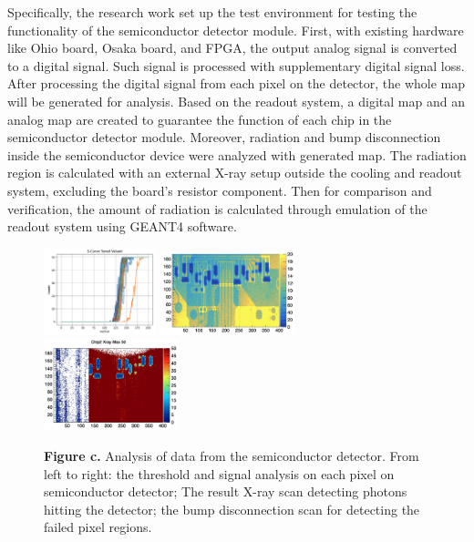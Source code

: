 \documentclass{article}
\begin{document}
Specifically, the research work set up the test environment for testing 
the functionality of the semiconductor detector module.
First, with existing hardware like Ohio board, Osaka board, and FPGA, the 
output analog signal is converted to a digital signal. 
Such signal is processed with supplementary digital signal loss. 
After processing the digital signal from each pixel on the detector, 
the whole map will be generated for analysis. Based on the readout system,
 a digital map and an analog map are created to guarantee the function of 
 each chip in the semiconductor detector module. Moreover, 
 radiation and bump disconnection inside the semiconductor device 
 were analyzed with generated map. The radiation region is calculated 
 with an external X-ray setup outside the cooling and readout system, 
 excluding the board's resistor component. Then for comparison and verification, 
 the amount of radiation is calculated through emulation of the readout system using GEANT4 software. 
\begin{figure}[h]
  \begin{center}
    \includegraphics[width=0.29\textwidth]{thesispic/ch3_normal_scurve.png}
    \includegraphics[width=0.35\textwidth]{thesispic/ch3_xray_cover_cp.jpeg}
    \includegraphics[width=0.35\textwidth]{thesispic/ch3_bump09base_xray.jpg}
    \caption*{ \textbf{Figure c.} Analysis of data from the semiconductor detector. From left to right: 
    the threshold and signal analysis on each pixel on semiconductor detector; The result X-ray 
    scan detecting photons hitting the detector; the bump disconnection scan 
    for detecting the failed pixel regions. }
  \end{center}
\end{figure}
\end{document}
